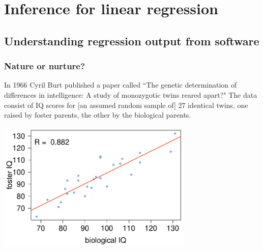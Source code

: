 
\section{Inference for linear regression}


\subsection{Understanding regression output from software}


\begin{frame}
\frametitle{Nature or nurture?}

{\small In 1966 Cyril Burt published a paper called ``The genetic determination of differences in intelligence: A study of monozygotic twins reared apart?" The data consist of IQ scores for [an assumed random sample of] 27 identical twins, one raised by foster parents, the other by the biological parents.}

\begin{center}
\includegraphics[width=0.7\textwidth]{8-4_inf_lin_reg/figures/twins/twins_IQ}
\end{center}

\end{frame}


